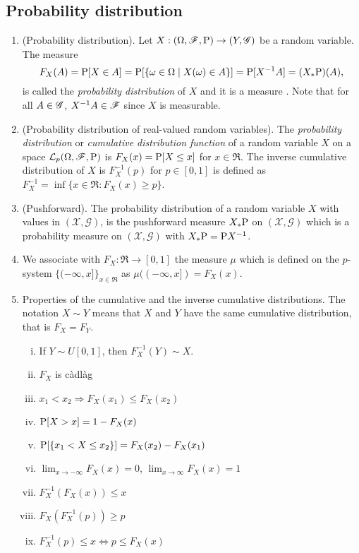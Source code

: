 \documentclass[a4paper,10pt]{article}
\begin{document}
\subsection{Probability distribution}
\begin{enumerate} 
 
 \item (Probability distribution). Let $X:(\Omega,\mathscr{F},\mathrm{P}) \to (Y, \mathscr{G})$ be a random variable. The measure
 \[
  F_X(A) = \mathrm{P}[X\in A] = \mathrm{P}[\{\omega\in\Omega\mid X(\omega) \in A\}] = \mathrm{P}[X^{-1}A] = (X_*\mathrm{P})(A),
 \]
 is called the \textit{probability distribution} of $X$ and it is a measure . Note that for all $A\in\mathscr{G}$, $X^{-1}A\in\mathscr{F}$
 since $X$ is measurable. 
 \item \label{rv221088}
 (Probability distribution of real-valued random variables).
 The \textit{probability distribution} or \textit{cumulative distribution function} of a random variable $X$ on a space
 $\mathcal{L}_p(\Omega,\mathscr{F},\mathrm{P})$ is $F_X(x) = \mathrm{P}[X\leq x]$ for $x\in\Re$. The inverse cumulative
 distribution of $X$ is $F_X^{-1}(p)$ for $p\in[0,1]$ is defined as 
 $F_X^{-1}=\inf\{x\in\Re: F_X(x) \geq p\}$. 
 
 \item (Pushforward).
 \label{rv221089}
 The probability distribution of a random variable $X$ with values in $(\mathcal{X},\mathscr{G})$,
 is the pushforward measure $X_*\mathrm{P}$ on $(\mathcal{X},\mathscr{G})$ which is 
 a probability measure on $(\mathcal{X},\mathscr{G})$ with $X_*\mathrm{P} = \mathrm{P} X^{-1}$.
 
 
 \item 
 \label{rv221137}
 We associate with $F_X:\Re\to[0,1]$ the measure $\mu$ which is defined on 
 the $p$-system $\{(-\infty,x]\}_{x\in\Re}$ as $\mu((-\infty, x]) = F_X(x)$.
 \item
 \label{rv231132}
 Properties of the cumulative and the inverse cumulative distributions. The notation
 $X\sim Y$ means that $X$ and $Y$ have the same cumulative distribution, that is 
 $F_X = F_Y$.
    \begin{enumerate}[i.]
      \item If $Y\sim U[0,1]$, then $F_X^{-1}(Y) \sim X$.
      \item $F_X$ is c\`adl\`ag
      \item $x_1<x_2 \Rightarrow F_X(x_1) \leq F_X(x_2)$
      \item $\mathrm{P}[X>x] = 1 - F_X(x)$
      \item $\mathrm{P}[\{x_1 < X \leq x_2\}] = F_X(x_2) - F_X(x_1)$
      \item $\lim_{x\to-\infty}F_X(x) = 0$, $\lim_{x\to\infty}F_X(x) = 1$
      \item $F_X^{-1}(F_X(x)) \leq x$
      \item $F_X(F_X^{-1}(p)) \geq p$
      \item $F_X^{-1}(p) \leq x \Leftrightarrow p \leq F_X(x)$
    \end{enumerate}
\end{enumerate}
\end{document}
